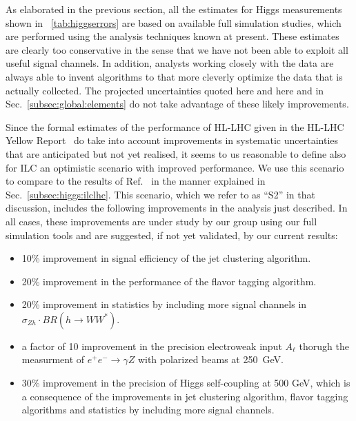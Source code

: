 







As elaborated in the previous section, all the estimates for Higgs measurements shown in
~\ref{tab:higgserrors} are based on available full simulation studies, which are performed using the analysis
techniques known at present. These estimates are clearly too
conservative in the sense that we have not been able to exploit all
useful signal channels.  In addition, analysts working closely with
the data are always able to invent algorithms to that more cleverly
optimize the data that is actually collected.   The projected
uncertainties  quoted here and
here and in Sec.~\ref{subsec:global:elements} do not take advantage of
these  likely improvements.

Since the formal estimates of the performance of HL-LHC given in the
HL-LHC Yellow Report~\cite{Cepeda:2019klc} do take into account
improvements in systematic uncertainties that are anticipated but not
yet realised, it seems to us reasonable to define also for ILC an
optimistic scenario with improved performance.   We use this scenario
to compare to the results of Ref.~\cite{Cepeda:2019klc} in the manner
explained in Sec.~\ref{subsec:higgs:ilclhc}.   This scenario, which we 
refer to as ``S2'' in that discussion, includes the following
improvements in the analysis just described.  In all cases, these
improvements are under study by our group using our full simulation
tools
and are  suggested, if not yet validated, by our current results: 
\begin{itemize}
\item 10\% improvement in signal efficiency of the  jet clustering algorithm.
\item 20\% improvement in the performance of the  flavor tagging algorithm. 
\item 20\% improvement in statistics by including more signal channels
  in  $\sigma_{Zh}\cdot BR(h\to WW^*)$. 
\item a factor of 10 improvement in the precision electroweak input
  $A_{\ell}$ thorugh the measurment of $e^+e^-\to\gamma Z$ with
  polarized beams at 250~GeV.
\item 30\% improvement in the precision of Higgs self-coupling at 500 GeV, which
is a consequence of the improvements in jet clustering algorithm, flavor tagging
algorithms and statistics by including more signal channels. 
\end{itemize}
